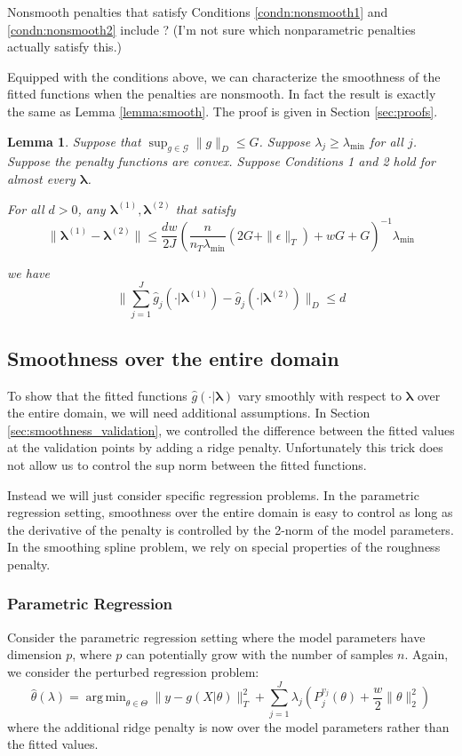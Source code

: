 \documentclass[12pt]{article}
\newtheorem{lemma}{Lemma}
\DeclareMathOperator*{\argmin}{arg\,min}
\begin{document}
Nonsmooth penalties that satisfy Conditions \ref{condn:nonsmooth1} and \ref{condn:nonsmooth2} include ? (I'm not sure which nonparametric penalties actually satisfy this.)

Equipped with the conditions above, we can characterize the smoothness of the fitted functions when the penalties are nonsmooth. In fact the result is exactly the same as Lemma \ref{lemma:smooth}. The proof is given in Section \ref{sec:proofs}. 

\begin{lemma}
\label{lemma:nonsmooth}
Suppose that $\sup_{g\in\mathcal{G}}\|g\|_{D}\le G$.
Suppose $\lambda_j \ge \lambda_{\min}$ for all $j$.
Suppose the penalty functions are convex.
Suppose Conditions 1 and 2 hold for almost every $\boldsymbol{\lambda}$.

For all $d>0$, any $\boldsymbol \lambda^{(1)}, \boldsymbol \lambda^{(2)}$ that satisfy 
\[
\|\boldsymbol \lambda^{(1)}- \boldsymbol \lambda^{(2)}\|\le\frac{dw}{2J}\left(\frac{n}{n_T \lambda_{\min} }\left(2G+\|\epsilon\|_{T}\right)+wG+G\right)^{-1}\lambda_{\min}
\]

we have
\[
\|\sum_{j=1}^{J}\hat{g}_{j}(\cdot| \boldsymbol \lambda^{(1)})-\hat{g}_{j}(\cdot| \boldsymbol \lambda^{(2)})\|_{D}\le d
\]
\end{lemma}

\subsection{Smoothness over the entire domain}
\label{sec:smoothness_domain}

To show that the fitted functions $\hat{g}(\cdot | \boldsymbol \lambda)$ vary smoothly with respect to $\boldsymbol \lambda$ over the entire domain, we will need additional assumptions. In Section \ref{sec:smoothness_validation}, we controlled the difference between the fitted values at the validation points by adding a ridge penalty. Unfortunately this trick does not allow us to control the sup norm between the fitted functions. 

Instead we will just consider specific regression problems. In the parametric regression setting, smoothness over the entire domain is easy to control as long as the derivative of the penalty is controlled by the 2-norm of the model parameters. In the smoothing spline problem, we rely on special properties of the roughness penalty.

\subsubsection{Parametric Regression}
Consider the parametric regression setting where the model parameters have dimension $p$, where $p$ can potentially grow with the number of samples $n$. Again, we consider the perturbed regression problem:
\begin{equation}
\hat{\theta}(\lambda) = \argmin_{\theta \in \Theta} \| y -  g(X| \theta) \|^2_T + \sum_{j=1}^J \lambda_j \left ( P^{v_j}_j(\theta) + \frac{w}{2} \| \theta \|^2_2 \right )
\end{equation}
where the additional ridge penalty is now over the model parameters rather than the fitted values.
\end{document}
